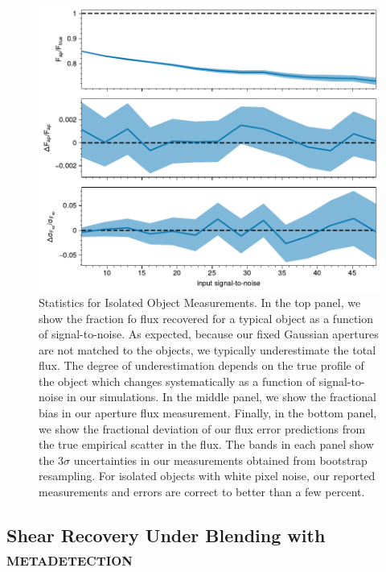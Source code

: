 \documentclass[twocolappendix, appendixfloats, numberedappendix, twocolumn, apj]{openjournal}
\newcommand{\mdet}{\textsc{metadetection}\xspace}
\begin{document}
\begin{figure}
  \centering
  \vspace{1em}
  \includegraphics[width=\columnwidth]{figures/test-noround-nodetect.pdf}
  \caption{
    Statistics for Isolated Object Measurements. In the top panel, we show the
    fraction fo flux recovered for a typical object as a function of signal-to-noise.
    As expected, because our fixed Gaussian apertures are not matched to the objects,
    we typically underestimate the total flux. The degree of underestimation depends on
    the true profile of the object which changes systematically as a function of
    signal-to-noise in our simulations. In the middle panel, we show the fractional bias in
    our aperture flux measurement. Finally, in the bottom panel,
    we show the fractional deviation of our flux error predictions from the true
    empirical scatter in the flux. The bands in each panel show the $3\sigma$ uncertainties
    in our measurements obtained from bootstrap resampling. For isolated objects
    with white pixel noise, our reported measurements and errors are correct to
    better than a few percent.
    \label{fig:noround_nodetect}
  }
\end{figure}


\subsection{Shear Recovery Under Blending with \mdet}
\end{document}
